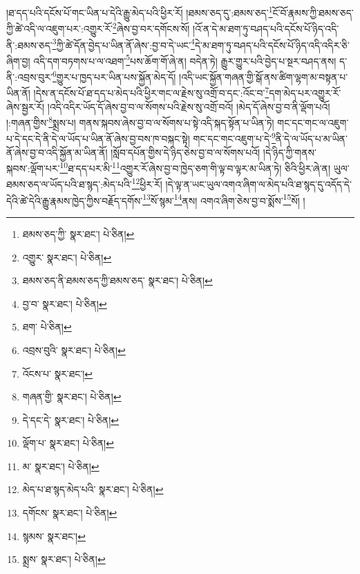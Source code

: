 །ཐ་དད་པའི་དངོས་པོ་གང་ཡིན་པ་དེའི་རྒྱུ་མེད་པའི་ཕྱིར་རོ། །ཐམས་ཅད་དུ་:ཐམས་ཅད་\footnote{ཐམས་ཅད་ཀྱི་  སྣར་ཐང་།  པེ་ཅིན། }ངོ་བོ་རྣམས་ཀྱི་ཐམས་ཅད་ཀྱི་ཚེ་འདི་ལ་འཇུག་པར་:འགྱུར་རོ་\footnote{འགྱུར་  སྣར་ཐང་།  པེ་ཅིན། }ཞེས་བྱ་བར་དགོངས་སོ། །འོ་ན་དེ་མ་ཐག་ཏུ་བཤད་པའི་དངོས་པོ་ཉིད་འདི་ནི་:ཐམས་ཅད་\footnote{ཐམས་ཅད་ནི་ཐམས་ཅད་ཀྱི་ཐམས་ཅད་  སྣར་ཐང་།  པེ་ཅིན། }ཀྱི་ཚེ་དོན་བྱེད་པ་ཡིན་ནོ་ཞེས་:བྱ་བ་དེ་ཡང་\footnote{བྱ་བ་  སྣར་ཐང་།  པེ་ཅིན། }དེ་མ་ཐག་ཏུ་བཤད་པའི་དངོས་པོ་ཉིད་འདི་འདིར་ཅི་ཞིག་བྱ། འདི་དག་བཏགས་པ་ལ་འཐག་\footnote{ཐག་  པེ་ཅིན། }པས་ཆོག་གོ་ཞེ་ན། བདེན་ཏེ། རྒྱུར་གྱུར་པའི་བྱེད་པ་སྔར་བཤད་ནས། ད་ནི་:འབྲས་བུར་\footnote{འབྲས་བུའི་  སྣར་ཐང་།  པེ་ཅིན། }གྱུར་པ་ཁྱད་པར་ཡིན་པས་སྐྱོན་མེད་དོ། །འདི་ཡང་སྐྱོན་གཞན་གྱི་སྒོ་ནས་ཚིག་ལྷག་མ་བསྟན་པ་ཡིན་ནོ། །དེས་ན་དངོས་པོ་ཐ་དད་པ་མེད་པའི་ཕྱིར་གང་ལ་རྗེས་སུ་འགྲོ་བ་དང་:འོང་བ་\footnote{འོངས་པ་  སྣར་ཐང་། }དག་མེད་པར་འགྱུར་རོ་ཞེས་སྦྱར་རོ། །འདི་འདིར་ཡོད་དོ་ཞེས་བྱ་བ་ལ་སོགས་པའི་རྗེས་སུ་འགྲོ་བའོ། །མེད་དོ་ཞེས་བྱ་བ་ནི་ལྡོག་པའོ། །:གཞན་གྱིས་\footnote{གཞན་གྱི་  སྣར་ཐང་།  པེ་ཅིན། }སྨྲས་པ། གནས་སྐབས་ཞེས་བྱ་བ་ལ་སོགས་པ་སྟེ་འདི་སྐད་སྟོན་པ་ཡིན་ཏེ། གང་དང་གང་ལ་འཇུག་པ་དེ་དང་དེ་ནི་དེ་ལ་ཡོད་པ་ཡིན་ནོ་ཞེས་བྱ་བས་ཁ་བསྐང་སྟེ། གང་དང་གང་འཇུག་པ་དེ་\footnote{དེ་དང་དེ་  སྣར་ཐང་།  པེ་ཅིན། }ནི་དེ་ལ་ཡོད་པ་མ་ཡིན་ནོ་ཞེས་བྱ་བ་འདི་སྐྱོན་མ་ཡིན་ནོ། །སློབ་དཔོན་གྱིས་དེ་ཉིད་ཅེས་བྱ་བ་ལ་སོགས་པའོ། །དེ་ཉིད་ཀྱི་གནས་སྐབས་:ལྡོག་པར་\footnote{ལྡོག་པ་  སྣར་ཐང་།  པེ་ཅིན། }ཐ་དད་པར་མི་\footnote{མ་  སྣར་ཐང་།  པེ་ཅིན། }འགྱུར་རོ་ཞེས་བྱ་བ་ཁྱེད་ཅག་གི་ལྟ་བ་ལྟར་མ་ཡིན་ཏེ། ཅིའི་ཕྱིར་ཞེ་ན། ཡུལ་ཐམས་ཅད་ལ་ཡོད་པའི་ཐ་སྙད་:མེད་པའི་\footnote{མེད་པ་ཐ་སྙད་མེད་པའི་  སྣར་ཐང་།  པེ་ཅིན། }ཕྱིར་རོ། །དེ་ལྟ་ན་ཡང་ཡུལ་འགའ་ཞིག་ལ་མེད་པའི་ཐ་སྙད་དུ་འདོད་དེ་དེའི་ཚེ་དེའི་རྒྱུ་རྣམས་ཁྱེད་ཀྱིས་བརྗོད་དགོས་\footnote{དགོངས་  སྣར་ཐང་།  པེ་ཅིན། }སོ་སྙམ་\footnote{སྙམས་  སྣར་ཐང་། }ནས། འགའ་ཞིག་ཅེས་བྱ་བ་སྨོས་\footnote{སྨྲས་  སྣར་ཐང་།  པེ་ཅིན། }སོ། །
